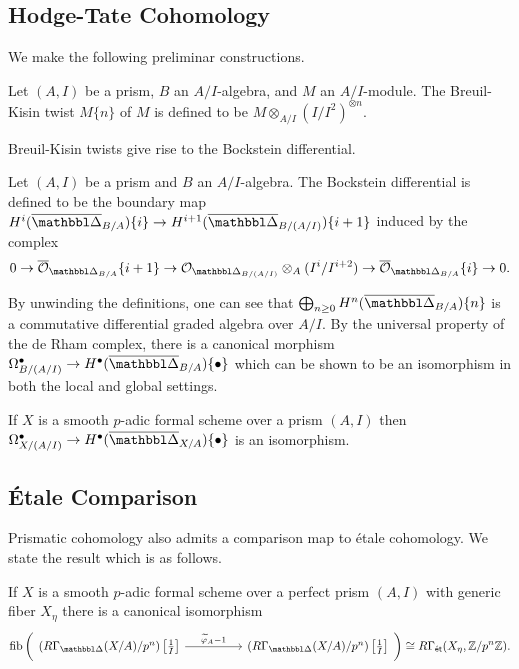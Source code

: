 \subsection{Hodge-Tate Cohomology}\label{subsec: Hodge-Tate cohomology}
We make the following preliminar constructions. 
\begin{definition}\label{def: Breuil-Kisin twist}
    Let $(A,I)$ be a prism, $B$ an $A/I$-algebra, and $M$ an $A/I$-module. The Breuil-Kisin twist $M\{n\}$ of $M$ is defined to be $M\otimes_{A/I}(I/I^{2})^{\otimes n}$. 
\end{definition}
Breuil-Kisin twists give rise to the Bockstein differential. 
\begin{definition}\label{def: Bockstein differential}
    Let $(A,I)$ be a prism and  $B$ an $A/I$-algebra. The Bockstein differential is defined to be the boundary map $H^{i}(\overline{\prism}_{B/A})\{i\}\to H^{i+1}(\overline{\prism}_{B/(A/I)})\{i+1\}$ induced by the complex
    $$0\to\overline{\Ocal}_{\prism_{B/A}}\{i+1\}\to\Ocal_{\prism_{B/(A/I)}}\otimes_{A}(I^{i}/I^{i+2})\to\overline{\Ocal}_{\prism_{B/A}}\{i\}\to0.$$
\end{definition}
By unwinding the definitions, one can see that $\bigoplus_{n\geq0}H^{n}(\overline{\prism}_{B/A})\{n\}$ is a commutative differential graded algebra over $A/I$. By the universal property of the de Rham complex, there is a canonical morphism $\Omega^{\bullet}_{B/(A/I)}\to H^{\bullet}(\overline{\prism}_{B/A})\{\bullet\}$ which can be shown to be an isomorphism in both the local and global settings. 
\begin{theorem}\label{thm: Hodge-Tate comparison}
    If $X$ is a smooth $p$-adic formal scheme over a prism $(A, I)$ then $\Omega^{\bullet}_{X/(A/I)}\to H^{\bullet}(\overline{\prism}_{X/A})\{\bullet\}$ is an isomorphism.
\end{theorem}
\subsection{\'{E}tale Comparison}\label{subsec: etale comparison}
Prismatic cohomology also admits a comparison map to \'{e}tale cohomology. We state the result which is as follows. 
\begin{theorem}\label{thm: etale comparison}
    If $X$ is a smooth $p$-adic formal scheme over a perfect prism $(A, I)$ with generic fiber $X_{\eta}$ there is a canonical isomorphism 
    $$\mathrm{fib}\left(%
    \begin{tikzcd}
        {\left(R\Gamma_{\prism}(X/A)/p^{n}\right)\left[\frac{1}{I}\right]} && {\left(R\Gamma_{\prism}(X/A)/p^{n}\right)\left[\frac{1}{I}\right]}
        \arrow["{\widetilde{\varphi}_{A}-1}", from=1-1, to=1-3]
    \end{tikzcd}\right)\cong R\Gamma_{\et}(X_{\eta}, \ZZ/p^{n}\ZZ).$$
\end{theorem}
